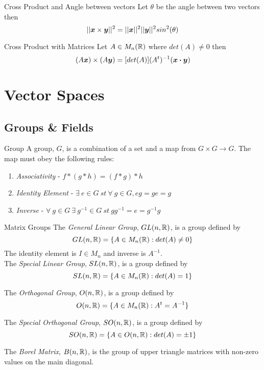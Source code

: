 \documentclass[11pt,a4paper]{article}
\begin{document}
\subtitle{Theorem 6.17 - }{Cross Product and Angle between vectors}
Let $\theta$ be the angle between two vectors then
$$||\boldsymbol{x} \times  \boldsymbol{y}||^2 = ||\boldsymbol{x}||^2||\boldsymbol{y}||^2 sin^2(\theta)$$

\subtitle{Theorem 6.18 - }{Cross Product with Matrices}
Let $A \in M_n(\mathbb{R})$ where $det(A) \not = 0$ then
$$(A\boldsymbol{x}) \times (A\boldsymbol{y}) = [det(A)](A^t)^{-1}(\boldsymbol{x} \boldsymbol{\cdot} \boldsymbol{y})$$

\section{Vector Spaces}

\subsection{Groups \& Fields}

\subtitle{Definition 7.1 - }{Group}
A group, $G$, is a combination of a set and a map from $G \times G \to G$. The map must obey the following rules:
\begin{enumerate}[label=\roman*)]
  \item \textit{Associativity} - $f * (g * h) = (f * g) * h$
  \item \textit{Identity Element} - $\exists\ e \in G\ st\ \forall\ g \in G, eg = ge = g$
  \item \textit{Inverse} - $\forall\ g \in G\ \exists\ g^{-1} \in G\ st\ gg^{-1} = e = g^{-1}g$
\end{enumerate}

\subtitle{Definition 7.2 - }{Matrix Groups}
The \textit{General Linear Group}, $GL(n, \mathbb{R})$, is a group defined by $$GL(n ,\mathbb{R}) = \{A \in M_n(\mathbb{R}) : det(A) \not = 0\}$$
The identity element is $I \in M_n$ and inverse is $A^{-1}$. \\

The \textit{Special Linear Group}, $SL(n, \mathbb{R})$, is a group defined by $$SL(n ,\mathbb{R}) = \{A \in M_n(\mathbb{R}) : det(A) = 1\}$$

The \textit{Orthogonal Group}, $O(n, \mathbb{R})$, is a group defined by $$O(n ,\mathbb{R}) = \{A \in M_n(\mathbb{R}) : A^t = A^{-1}\}$$

The \textit{Special Orthogonal Group}, $SO(n, \mathbb{R})$, is a group defined by $$SO(n ,\mathbb{R}) = \{A \in O(n, \mathbb{R}) : det(A) = \pm 1\}$$

The \textit{Borel Matrix}, $B(n, \mathbb{R})$, is the group of upper triangle matrices with non-zero values on the main diagonal.\\
\end{document}
